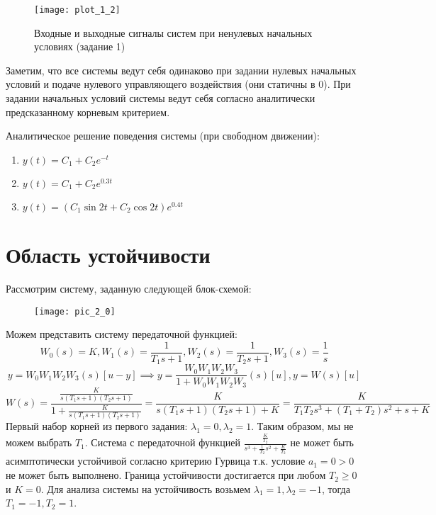  \begin{figure}[h]
    \centering
    \texttt{[image: plot\_1\_2]}
    \caption{\label{fig:The-caption-1}Входные и выходные сигналы систем при ненулевых начальных условиях (задание 1)}
\end{figure}

Заметим, что все системы ведут себя одинаково при задании нулевых начальных условий 
и подаче нулевого управляющего воздействия (они статичны в 0). При задании начальных условий системы
ведут себя согласно аналитически предсказанному корневым критерием.

Аналитическое решение поведения системы (при свободном движении):
\begin{enumerate}
    \item $y(t) = C_1 + C_2 e^{-t}$
    \item $y(t) = C_1 + C_2 e^{0.3t}$
    \item $y(t) = (C_1 \sin{2t} + C_2 \cos{2t}) e^{0.4t}$
\end{enumerate}

\pagebreak

\section{Область устойчивости}
Рассмотрим систему, заданную следующей блок-схемой:
\begin{figure}[h]
    \centering
    \texttt{[image: pic\_2\_0]}
\end{figure}

Можем представить систему передаточной функцией:
\begin{equation*}
    W_0(s) = K, W_1(s) = \frac{1}{T_1 s + 1}, W_2(s) = \frac{1}{T_2 s + 1}, W_3(s)=\frac{1}{s} 
\end{equation*}
\begin{equation*}
    y = W_0W_1W_2W_3(s)[u - y] \implies y = \frac{W_0W_1W_2W_3}{1 + W_0W_1W_2W_3}(s)[u], y = W(s)[u]
\end{equation*}
\begin{equation}
    W(s)=\frac{\frac{K}{s(T_1 s + 1)(T_2 s + 1)}}{1 + \frac{K}{s(T_1 s + 1)(T_2 s + 1)}}=
    \frac{K}{s(T_1 s + 1)(T_2 s + 1) + K}=\frac{K}{T_1 T_2 s^3 + (T_1 + T_2) s^2 + s + K}
\end{equation}
Первый набор корней из первого задания: $\lambda_1 = 0, \lambda_2 = 1$. Таким образом, мы 
не можем выбрать $T_1$. Система с передаточной функцией $\frac{\frac{K}{T_2}}{s^3 + \frac{1}{T_2}s^2 + \frac{K}{T_2}}$
не может быть асимптотически устойчивой согласно критерию Гурвица т.к. условие $a_1 = 0 > 0$ не может быть выполнено.
Граница устойчивости достигается при любом $T_2 \ge 0$ и $K=0$.
Для анализа системы на устойчивость возьмем $\lambda_1 = 1, \lambda_2 = -1$, тогда $T_1=-1, T_2=1$.

